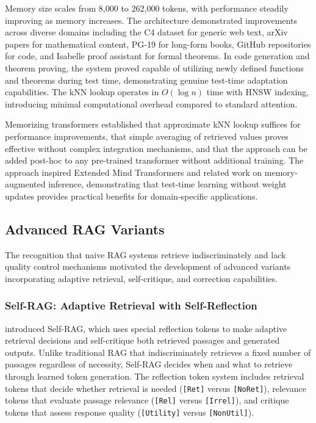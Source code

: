 Memory size scales from 8,000 to 262,000 tokens, with performance steadily improving as memory increases. The architecture demonstrated improvements across diverse domains including the C4 dataset for generic web text, arXiv papers for mathematical content, PG-19 for long-form books, GitHub repositories for code, and Isabelle proof assistant for formal theorems. In code generation and theorem proving, the system proved capable of utilizing newly defined functions and theorems during test time, demonstrating genuine test-time adaptation capabilities. The kNN lookup operates in $O(\log n)$ time with HNSW indexing, introducing minimal computational overhead compared to standard attention.

Memorizing transformers established that approximate kNN lookup suffices for performance improvements, that simple averaging of retrieved values proves effective without complex integration mechanisms, and that the approach can be added post-hoc to any pre-trained transformer without additional training. The approach inspired Extended Mind Transformers and related work on memory-augmented inference, demonstrating that test-time learning without weight updates provides practical benefits for domain-specific applications.

\subsection{Advanced RAG Variants}

The recognition that naive RAG systems retrieve indiscriminately and lack quality control mechanisms motivated the development of advanced variants incorporating adaptive retrieval, self-critique, and correction capabilities.

\subsubsection{Self-RAG: Adaptive Retrieval with Self-Reflection}

\citet{asai2024selfrag} introduced Self-RAG, which uses special reflection tokens to make adaptive retrieval decisions and self-critique both retrieved passages and generated outputs. Unlike traditional RAG that indiscriminately retrieves a fixed number of passages regardless of necessity, Self-RAG decides when and what to retrieve through learned token generation. The reflection token system includes retrieval tokens that decide whether retrieval is needed ({\tt [Ret]} versus {\tt [NoRet]}), relevance tokens that evaluate passage relevance ({\tt [Rel]} versus {\tt [Irrel]}), and critique tokens that assess response quality ({\tt [Utility]} versus {\tt [NonUtil]}).

